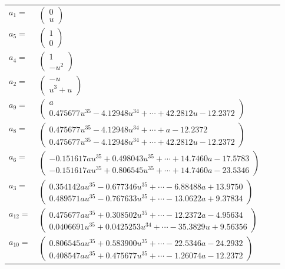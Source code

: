 \documentclass[1p]{elsarticle_modified}
\theoremstyle{definition}
\begin{document}
\begin{tabular}{m{7pt} m{180pt} m{7pt} m{180pt} }
\flushright $a_{1}=$&$\begin{pmatrix}0\\u\end{pmatrix}$ \\
\flushright $a_{5}=$&$\begin{pmatrix}1\\0\end{pmatrix}$ \\
\flushright $a_{4}=$&$\begin{pmatrix}1\\- u^2\end{pmatrix}$ \\
\flushright $a_{2}=$&$\begin{pmatrix}- u\\u^3+u\end{pmatrix}$ \\
\flushright $a_{9}=$&$\begin{pmatrix}a\\0.475677 u^{35}-4.12948 u^{34}+\cdots+42.2812 u-12.2372\end{pmatrix}$ \\
\flushright $a_{8}=$&$\begin{pmatrix}0.475677 u^{35}-4.12948 u^{34}+\cdots+a-12.2372\\0.475677 u^{35}-4.12948 u^{34}+\cdots+42.2812 u-12.2372\end{pmatrix}$ \\
\flushright $a_{6}=$&$\begin{pmatrix}-0.151617 a u^{35}+0.498043 u^{35}+\cdots+14.7460 a-17.5783\\-0.151617 a u^{35}+0.806545 u^{35}+\cdots+14.7460 a-23.5346\end{pmatrix}$ \\
\flushright $a_{3}=$&$\begin{pmatrix}0.354142 a u^{35}-0.677346 u^{35}+\cdots-6.88488 a+13.9750\\0.489571 a u^{35}-0.767633 u^{35}+\cdots-13.0622 a+9.37834\end{pmatrix}$ \\
\flushright $a_{12}=$&$\begin{pmatrix}0.475677 a u^{35}+0.308502 u^{35}+\cdots-12.2372 a-4.95634\\0.0406691 u^{35}+0.0425253 u^{34}+\cdots-35.3829 u+9.56356\end{pmatrix}$ \\
\flushright $a_{10}=$&$\begin{pmatrix}0.806545 a u^{35}+0.583900 u^{35}+\cdots-22.5346 a-24.2932\\0.408547 a u^{35}+0.475677 u^{35}+\cdots-1.26074 a-12.2372\end{pmatrix}$ \\

\end{tabular}
\end{document}

